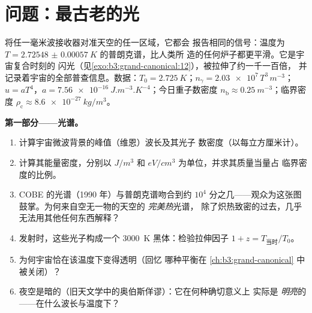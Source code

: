 \section{问题：最古老的光}

\begin{problem}\label{pb:b3:photons-phonons:1}
将任一毫米波接收器对准天空的任一区域，它都会
报告相同的信号：温度为 $T =
\qty{2.72548(57)}{K}$ 的普朗克谱，比人类所
造的任何炉子都更平滑。它是宇宙复合时刻的
闪光（见\cref{exo:b3:grand-canonical:12}），被拉伸了约一千一百倍，
并记录着宇宙的全部普查信息。数据：$T_0 =
\qty{2.725}{K}$；$n_\gamma = \num{2.03e7}\,T^3\,\unit{m^{-3}}$；
$u = aT^4$，$a = \qty{7.56e-16}{J.m^{-3}.K^{-4}}$；今日重子数密度
$n_{\text{b}} \approx \qty{0.25}{m^{-3}}$；临界密度
$\rho_{\text{c}} \approx \qty{8.6e-27}{kg/m^3}$。

\medskip\noindent\textbf{第一部分——光谱。}
\begin{enumerate}
  \item 计算宇宙微波背景的峰值（维恩）波长及其光子
        数密度（以每立方厘米计）。
  \item 计算其能量密度，分别以 $\unit{J/m^3}$ 和
        $\unit{eV/cm^3}$ 为单位，并求其质量当量占
        临界密度的比例。
  \item COBE 的光谱（1990 年）与普朗克谱吻合到约
        $10^4$ 分之几——观众为这张图鼓掌。为何来自空无一物的天空的
        \emph{完美热}光谱，
        除了炽热致密的过去，几乎无法用其他任何东西解释？
  \item 发射时，这些光子构成一个 \qty{3000}{K}
        黑体：检验拉伸因子 $1 + z =
        T_{\text{当时}}/T_0$。
  \item 为何宇宙恰在该温度下变得透明（回忆
        哪种平衡在
        \cref{ch:b3:grand-canonical} 中被关闭）？
  \item 夜空是暗的（旧天文学中的奥伯斯佯谬）：它在何种确切意义上
        实际是
        \emph{明亮}的——在什么波长与温度下？
\end{enumerate}


\end{problem}
